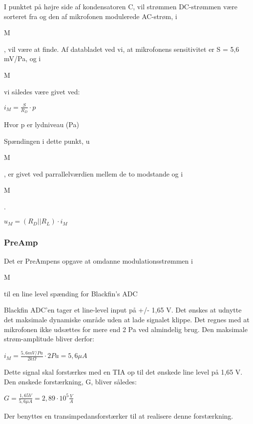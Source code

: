 I punktet på højre side af kondensatoren C, vil strømmen DC-strømmen være sorteret fra og den af mikrofonen modulerede AC-strøm, i\begin{tiny}M\end{tiny}, vil være at finde. Af databladet ved vi, at mikrofonens sensitivitet er S = 5,6 mV/Pa, og i\begin{tiny}M\end{tiny} vi således være givet ved: 
\begin{center}
${ i }_{ M }=\frac { S }{ { R }_{ D } } \cdot p$
\end{center}
Hvor p er lydniveau (Pa)

Spændingen i dette punkt, u\begin{tiny}M\end{tiny}, er givet ved parrallelværdien mellem de to modstande og i\begin{tiny}M\end{tiny}. 
\begin{center}
${ u }_{ M }=({ R }_{ D }||{ R }_{ L })\cdot { i }_{ M } $
\end{center}

\subsubsection{PreAmp} 
Det er PreAmpens opgave at omdanne modulationsstrømmen i\begin{tiny}M\end{tiny} til en line level spænding for Blackfin's ADC 

Blackfin ADC'en tager et line-level input på +/- 1,65 V. 
Det ønskes at udnytte det maksimale dynamiske område uden at lade signalet klippe. Det regnes med at mikrofonen ikke udsættes for mere end 2 Pa ved almindelig brug. Den maksimale strøm-amplitude bliver derfor: 
\begin{center}
${ i }_{ M }=\frac { 5,6mV/Pa }{ 2k\Omega  } \cdot 2Pa=5,6 \mu A$
\end{center}
Dette signal skal forstærkes med en TIA op til det ønskede line level på 1,65 V. Den ønskede forstærkning, G, bliver således:
\begin{center}
$G=\frac { 1,65V }{ 5,6\mu A } =2,89\cdot { 10 }^{ 5 }\frac { V }{ A } $
\end{center}

Der benyttes en transimpedansforstærker til at realisere denne forstærkning. 

